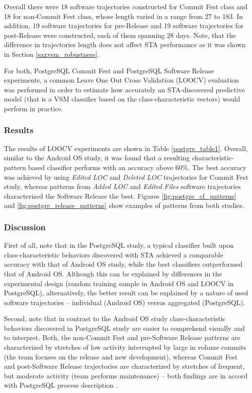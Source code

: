 Overall there were 18 software trajectories constructed for Commit Fest class and 18 for non-Commit Fest class, whose length varied in a range from 27 to 183. In addition, 19 software trajectories for pre-Release and 19 software trajectories for post-Release were constructed, each of them spanning 28 days. Note, that the difference in trajectories length does not affect STA performance as it was shown in Section \ref{saxvsm_robustness}.

For both, PostgreSQL Commit Fest and PostgreSQL Software Release experiments, a common Leave One Out Cross Validation (LOOCV) \cite{citeulike:11275990} evaluation was performed in order to estimate how accurately an STA-discovered predictive model (that is a VSM classifier based on the class-characteristic vectors) would perform in practice.

\subsubsection{Results}
The results of LOOCV experiments are shown in Table \ref{postgre_table1}. Overall, similar to the Android OS study, it was found that a resulting characteristic-pattern based classifier performs with an accuracy above 60\%. The best accuracy was achieved by using \textit{Edited LOC} and \textit{Deleted LOC} trajectories for Commit Fest study, whereas patterns from \textit{Added LOC} and \textit{Edited Files} software trajectories characterized the Software Release the best. Figures \ref{fig:postgre_cf_patterns} and \ref{fig:postgre_release_patterns} show examples of patterns from both studies.

\subsubsection{Discussion}
First of all, note that in the PostgreSQL study, a typical classifier built upon class-characteristic behaviors discovered with STA achieved a comparable accuracy with that of Android OS study, while the best classifiers outperformed that of Android OS. Although  this can be explained by differences in the experimental design (random training sample in Android OS and LOOCV in PostgreSQL), alternatively, the better result can be explained by a nature of used software trajectories -- individual (Android OS) versus aggregated (PostgreSQL).

Second, note that in contrast to the Android OS study class-characteristic behaviors discovered in PostgreSQL study are easier to comprehend visually and to interpret. Both, the non-Commit Fest and pre-Software Release patterns are characterized by stretches of low activity interrupted by large in volume commits (the team focuses on the release and new development), whereas Commit Fest and post-Software Release trajectories are characterized by stretches of frequent, but moderate activity (team performs maintenance) -- both findings are in accord with PostgreSQL process description \cite{commit-fest}.
\clearpage

